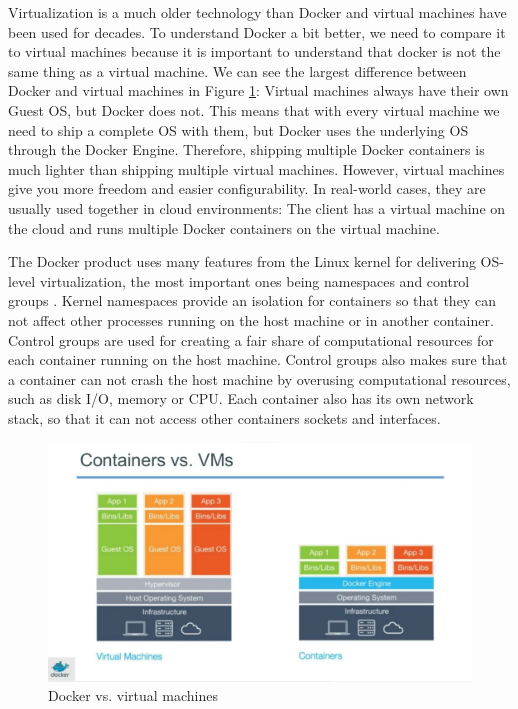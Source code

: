 \documentclass[fleqn,12pt]{olplainarticle}
\begin{document}
Virtualization is a much older technology than Docker and virtual machines have been used for decades. To understand Docker a bit better, we need to compare
it to virtual machines because it is important to understand that docker is not the same thing as a virtual machine. We can see the largest difference between Docker and virtual machines in Figure \ref{fig:dockervsvm}: Virtual machines always have their own Guest OS, but Docker does not. This means that with every virtual machine we need to ship a complete OS with them, but Docker uses the underlying OS through the Docker Engine. Therefore, shipping multiple Docker containers is much lighter than shipping multiple virtual machines. However, virtual machines give you more freedom and easier configurability. In real-world cases, they are usually used together in cloud environments: The client has a virtual machine on the cloud and runs multiple Docker containers on the virtual machine.

The Docker product uses many features from the Linux kernel for delivering OS-level virtualization, the most important ones being namespaces and control groups \citep{docker:security}. Kernel namespaces provide an isolation for containers so that they can not affect other processes running on the host machine or in another container. Control groups are used for creating a fair share of computational resources for each container running on the host machine. Control groups also makes sure that a container can not crash the host machine by overusing computational resources, such as disk I/O, memory or CPU. Each container also has its own network stack, so that it can not access other containers sockets and interfaces.

\begin{figure}[h]
    \centering
    \includegraphics[width=1\textwidth]{docker_vs_vm.png}
    \caption{Docker vs. virtual machines \cite{docker:vs_vm}}
    \label{fig:dockervsvm}
\end{figure}
\end{document}
